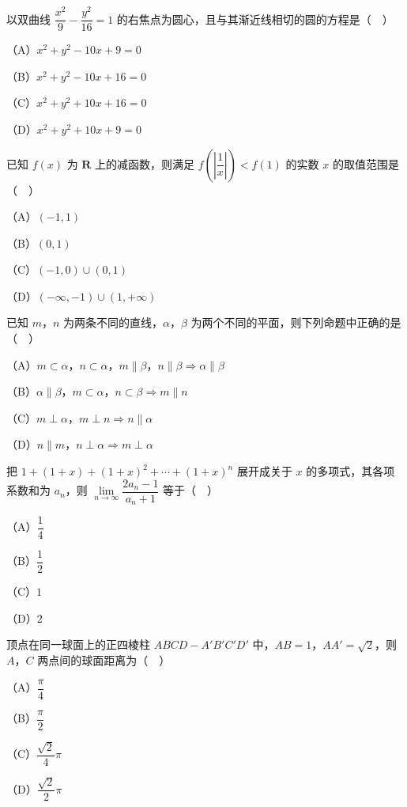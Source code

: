 \begin{question}
以双曲线 $\dfrac{x^2}9-\dfrac{y^2}{16}=1$ 的右焦点为圆心，且与其渐近线相切的圆的方程是（　）

（A）$x^2+y^2-10x+9=0$

（B）$x^2+y^2-10x+16=0$

（C）$x^2+y^2+10x+16=0$

（D）$x^2+y^2+10x+9=0$

\end{question}
\begin{question}
已知 $f(x)$ 为 $\mathbf R$ 上的减函数，则满足 $f\left(\left|\dfrac1x\right|\right)<f(1)$ 的实数 $x$ 的取值范围是（　）

（A）$(-1,1)$

（B）$(0,1)$

（C）$(-1,0)\cup(0,1)$

（D）$(-\infty,-1)\cup(1,+\infty)$

\end{question}
\begin{question}
已知 $m$，$n$ 为两条不同的直线，$\alpha$，$\beta$ 为两个不同的平面，则下列命题中正确的是（　）

（A）$m\subset\alpha$，$n\subset\alpha$，$m\parallel\beta$，$n\parallel\beta\Rightarrow\alpha\parallel\beta$

（B）$\alpha\parallel\beta$，$m\subset\alpha$，$n\subset\beta\Rightarrow m\parallel n$

（C）$m\perp\alpha$，$m\perp n\Rightarrow n\parallel\alpha$

（D）$n\parallel m$，$n\perp\alpha\Rightarrow m\perp\alpha$

\end{question}
\begin{question}
把 $1+(1+x)+(1+x)^2+\cdots+(1+x)^n$ 展开成关于 $x$ 的多项式，其各项系数和为 $a_n$，则 $\lim\limits_{n\to\infty}\dfrac{2a_n-1}{a_n+1}$ 等于（　）

（A）$\dfrac14$

（B）$\dfrac12$

（C）$1$

（D）$2$

\end{question}
\begin{question}
顶点在同一球面上的正四棱柱 $ABCD-A'B'C'D'$ 中，$AB=1$，$AA'=\sqrt2$，则 $A$，$C$ 两点间的球面距离为（　）

（A）$\dfrac{\pi}4$

（B）$\dfrac{\pi}2$

（C）$\dfrac{\sqrt2}4\pi$

（D）$\dfrac{\sqrt2}2\pi$

\end{question}
